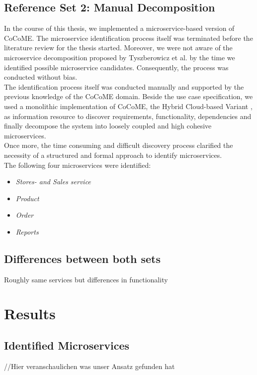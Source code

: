 \subsection{Reference Set 2: Manual Decomposition}
In the course of this thesis, we implemented a microservice-based version of CoCoME. The microservice identification process itself was terminated before the literature review for the thesis started. Moreover, we were not aware of the microservice decomposition proposed by Tyszberowicz et al. \cite{FunctionalDecompositionHeinrich} by the time we identified possible microservice candidates. Consequently, the process was conducted without bias. \\
The identification process itself was conducted manually and supported by the previous knowledge of the CoCoME domain. Beside the use case specification, we used a monolithic implementation of CoCoME, the Hybrid Cloud-based Variant \cite{CoCoMETechnical}, as information resource to discover requirements, functionality, dependencies and finally decompose the system into loosely coupled and high cohesive microservices. \\
Once more, the time consuming and difficult discovery process clarified the necessity of a structured and formal approach to identify microservices. \\
The following four microservices were identified:
\begin{itemize}
	\item \textit{Stores- and Sales service}
	\item \textit{Product}
	\item \textit{Order}
	\item \textit{Reports}
\end{itemize}

\subsection{Differences between both sets}
Roughly same services but differences in functionality




\section{Results}
\label{sec:Evalutation:Results}

\subsection{Identified Microservices}
//Hier veranschaulichen was unser Ansatz gefunden hat


